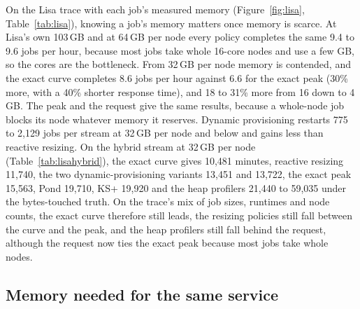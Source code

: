 \documentclass[11pt]{article}
\newcommand{\figref}[1]{Figure~\ref{#1}}
\newcommand{\tabref}[1]{Table~\ref{#1}}
\begin{document}
\begin{table}[t]
\centering
\caption{The measured Lisa stream at offered load 0.8: jobs per hour and mean response time for each local memory per node
(mean of three seeds). The load is set against each cluster's memory, so numbers compare across rows, not across columns.}
\label{tab:lisa}
\resizebox{\textwidth}{!}{}
\end{table}

\begin{table}[t]
\centering
\caption{The hybrid Lisa stream (the trace's jobs with corpus footprint shapes) at 32\,GB per node and offered load 0.8,
calibrated 90\% margins. Fails counts OOM kills, restarts and retries.}
\label{tab:lisahybrid}
\resizebox{0.8\textwidth}{!}{}
\end{table}

On the Lisa trace with each job's measured memory (\figref{fig:lisa}, \tabref{tab:lisa}), knowing a job's memory matters once
memory is scarce. At Lisa's own 103\,GB and at 64\,GB per node every policy completes the same 9.4 to 9.6 jobs per hour, because
most jobs take whole 16-core nodes and use a few GB, so the cores are the bottleneck. From 32\,GB per node memory is
contended, and the exact curve completes 8.6 jobs per hour against 6.6 for the exact peak (30\% more, with a 40\% shorter
response time), and 18 to 31\% more from 16 down to 4\,GB. The peak and the request give the same results, because a
whole-node job blocks its node whatever memory it reserves. Dynamic provisioning restarts 775 to 2{,}129 jobs per stream at
32\,GB per node and below and gains less than reactive resizing. On the hybrid stream at 32\,GB per node
(\tabref{tab:lisahybrid}), the exact curve gives 10{,}481 minutes, reactive resizing 11{,}740, the two dynamic-provisioning
variants 13{,}451 and 13{,}722, the exact peak 15{,}563, Pond 19{,}710, KS+ 19{,}920 and the heap profilers 21{,}440 to
59{,}035 under the bytes-touched truth. On the trace's mix of job sizes, runtimes and node counts, the exact curve
therefore still leads, the resizing policies still fall between the curve and the peak, and the heap profilers still fall
behind the request, although the request now ties the exact peak because most jobs take whole nodes.

\subsection{Memory needed for the same service}
\end{document}
